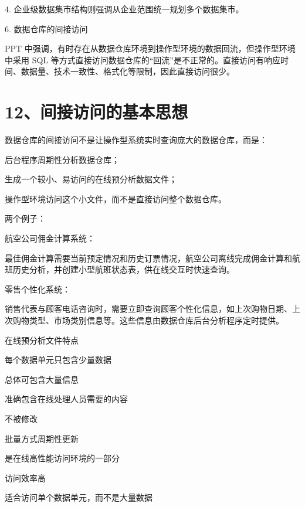 \documentclass[UTF8,zihao=-4]{ctexart}
\begin{document}
4. 企业级数据集市结构则强调从企业范围统一规划多个数据集市。\par

6. 数据仓库的间接访问\par

PPT 中强调，有时存在从数据仓库环境到操作型环境的数据回流，但操作型环境中采用 SQL 等方式直接访问数据仓库的“回流”是不正常的。直接访问有响应时间、数据量、技术一致性、格式化等限制，因此直接访问很少。\par

\newpage
\section*{12、间接访问的基本思想}

数据仓库的间接访问不是让操作型系统实时查询庞大的数据仓库，而是：\par

后台程序周期性分析数据仓库；\par
生成一个较小、易访问的在线预分析数据文件；\par
操作型环境访问这个小文件，而不是直接访问整个数据仓库。\par

两个例子：\par

航空公司佣金计算系统：\par
最佳佣金计算需要当前预定情况和历史订票情况，航空公司离线完成佣金计算和航班历史分析，并创建小型航班状态表，供在线交互时快速查询。\par

零售个性化系统：\par
销售代表与顾客电话咨询时，需要立即查询顾客个性化信息，如上次购物日期、上次购物类型、市场类别信息等。这些信息由数据仓库后台分析程序定时提供。\par

在线预分析文件特点\par

每个数据单元只包含少量数据\par
总体可包含大量信息\par
准确包含在线处理人员需要的内容\par
不被修改\par
批量方式周期性更新\par
是在线高性能访问环境的一部分\par
访问效率高\par
适合访问单个数据单元，而不是大量数据\par
\end{document}
